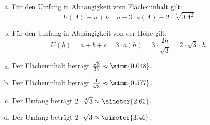 \begin{exercise}
\begin{enumerate}[a)]
      \item Für den Umfang in Abhängigkeit vom Flächeninhalt gilt:
            \begin{equation*}
              U(A)
              =
              a+b+c
              =
              3\cdot a(A)
              =
              2\cdot\sqrt[4]{3A^2}
            \end{equation*}
      \item Für den Umfang in Abhängigkeit von der Höhe gilt:
            \begin{equation*}
              U(h)
              =
              a+b+c
              =
              3\cdot a(h)
              =
              3\cdot\frac{2h}{\sqrt{3}}
              =
              2\cdot\sqrt{3}\cdot h
            \end{equation*}
    \end{enumerate}
  \fi
  \ifoutcome\outcome
    \begin{enumerate}[a)]
      \item Der Flächeninhalt beträgt $\frac{\sqrt{3}}{36}\approx\simm{0.048}$.
      \item Der Flächeninhalt beträgt $\frac{1}{\sqrt{3}}\approx\simm{0.577}$.
      \item Der Umfang beträgt $2\cdot\sqrt[4]{3}\approx\simeter{2.63}$.
      \item Der Umfang beträgt $2\cdot\sqrt{3}\approx\simeter{3.46}$.
    \end{enumerate}
  \fi
\end{exercise}

